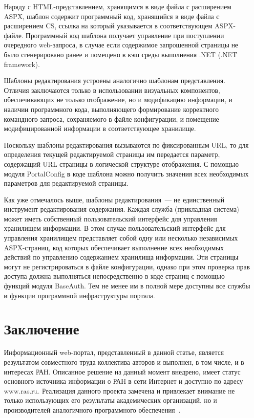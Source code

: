 \begin{multicols}{2}
 Наряду с HTML-представлением, хранящимся в виде файла с расширением ASPX,
шаблон содержит программный код, хранящийся в виде файла с расширением CS, ссылка
на который указывается в соответствующем ASPX-файле. Программный код шаблона
получает управление при поступлении очередного web-запроса, в случае если содержимое
запрошенной страницы не было сгенерировано ранее и помещено в кэш среды
выполнения .NET (.NET framework).

 Шаблоны редактирования устроены аналогично шаблонам представления. Отличия
заключаются только в использовании визуальных компонентов, обеспечивающих не
только отображение, но и модификацию информации, и наличии программного кода,
выполняющего формирование корректного командного запроса, сохраняемого в файле
конфигурации, и помещение модифицированной информации в соответствующее
хранилище.

 Поскольку шаблоны редактирования вызываются по фиксированным URL, то для
определения текущей редактируемой страницы им передается параметр, содержащий URL
страницы в логической структуре отображения. С помощью модуля PortalConfig в коде
шаблона можно получить значения всех необходимых параметров для редактируемой
страницы.

 Как уже отмечалось выше, шаблоны редактирования~--- не единственный
инструмент редактирования содержания. Каждая служба (прикладная сис\-те\-ма) может
иметь собственный пользовательский интерфейс для управления хранилищем
инфор\-ма\-ции. В этом случае пользовательский интерфейс для управления хранилищем
представляет собой одну или несколько независимых ASPX-стра\-ниц, код которых
обеспечивает выполнение всех необходимых действий по управлению содержанием
хранилища информации. Эти страницы могут не регистрироваться в файле конфигурации,
однако при этом проверка прав доступа должна выполняться непосредственно в коде
страниц с помощью функций модуля BaseAuth. Тем не менее им в полной мере доступны
все службы и функции программной инфраструктуры портала.

\section{Заключение} %

 Информационный web-портал, представленный в данной статье, является
результатом совместного труда коллектива авторов и выполнен, в том числе,
и в интересах РАН. Описанное решение на данный момент внедрено, имеет статус
основного источника информации о РАН в сети Интернет и доступно по адресу
{\sf www.ras.ru}. Реализация данного проекта замечена и привлекает внимание
не только использующих его результаты академических организаций, но и
производителей аналогичного программного обеспечения~\cite{13bos, 14bos}.


\end{multicols}
